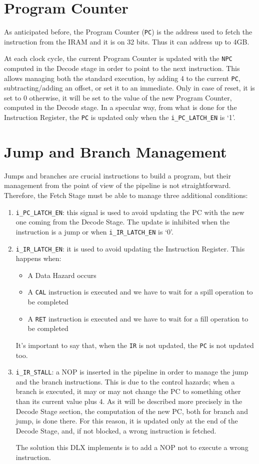 \section{Program Counter}
As anticipated before, the Program Counter (\texttt{PC}) is the address used to fetch the instruction from the IRAM and it is on 32 bits. Thus it can address up to 4GB.

At each clock cycle, the current Program Counter is updated with the \texttt{NPC} computed in the Decode stage in order to point to the next instruction. This allows managing both the standard execution, by adding 4 to the current \texttt{PC}, subtracting/adding an offset, or set it to an immediate. Only in case of reset, it is set to 0 otherwise, it will be set to the value of the new Program Counter, computed in the Decode stage. In a specular way, from what is done for the Instruction Register, the \texttt{PC} is updated only when the \texttt{i\_PC\_LATCH\_EN} is `1'.

\section{Jump and Branch Management}
\label{sec:jmp_branch}
Jumps and branches are crucial instructions to build a program, but their management from the point of view of the pipeline is not straightforward. Therefore, the Fetch Stage must be able to manage three additional conditions:
\begin{enumerate}
    \item \texttt{i\_PC\_LATCH\_EN}: this signal is used to avoid updating the PC with the new one coming from the Decode Stage. The update is inhibited when the instruction is a jump or when \texttt{i\_IR\_LATCH\_EN} is `0'. 
    \item \texttt{i\_IR\_LATCH\_EN}: it is used to avoid updating the Instruction Register. This happens when:
    \begin{itemize}
        \item A Data Hazard occurs
        \item A \texttt{CAL} instruction is executed and we have to wait for a spill operation to be completed
        \item A \texttt{RET} instruction is executed and we have to wait for a fill operation to be completed
    \end{itemize}
    It's important to say that, when the \texttt{IR} is not updated, the \texttt{PC} is not updated too.
    \item \texttt{i\_IR\_STALL}: a NOP is inserted in the pipeline in order to manage the jump and the branch instructions. This is due to the control hazards; when a branch is executed, it may or may not change the PC to something other than its current value plus 4. As it will be described more precisely in the Decode Stage section, the computation of the new PC, both for branch and jump, is done there. For this reason, it is updated only at the end of the Decode Stage, and, if not blocked, a wrong instruction is fetched.
    
    The solution this DLX implements is to add a NOP not to execute a wrong instruction.
\end{enumerate}